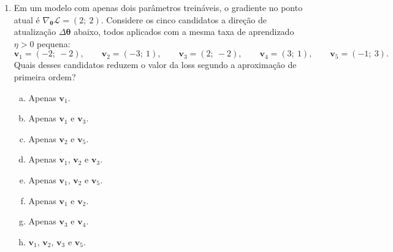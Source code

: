 \documentclass{dlproblemset}
\begin{document}
\begin{enumerate}[1)]
    \begin{enumerate}[(a)]
        \item Prevista $-3{,}20$ e real $-2{,}72$.
        \item Prevista $-2{,}72$ e real $-3{,}20$.
        \item Prevista $-3{,}20$ e real $-3{,}20$.
        \item Prevista $-0{,}32$ e real $-2{,}72$.
        \item Prevista $-3{,}20$ e real $-3{,}08$.
        \item Prevista $-2{,}00$ e real $-2{,}16$.
        \item Prevista $-3{,}20$ e real $-3{,}68$.
        \item Prevista $-6{,}40$ e real $-2{,}72$.
    \end{enumerate}

    \item Em um modelo com apenas dois parâmetros treináveis, o gradiente no ponto atual é $\nabla_{\boldsymbol{\theta}}\mathcal{L} = (2;\ 2)$. Considere os cinco candidatos a direção de atualização $\Delta\boldsymbol{\theta}$ abaixo, todos aplicados com a mesma taxa de aprendizado $\eta > 0$ pequena:
    \[
    \mathbf{v}_1 = (-2;\ -2), \qquad
    \mathbf{v}_2 = (-3;\ 1), \qquad
    \mathbf{v}_3 = (2;\ -2), \qquad
    \mathbf{v}_4 = (3;\ 1), \qquad
    \mathbf{v}_5 = (-1;\ 3).
    \]
    Quais desses candidatos reduzem o valor da loss segundo a aproximação de primeira ordem?

    \begin{enumerate}[(a)]
        \item Apenas $\mathbf{v}_1$.
        \item Apenas $\mathbf{v}_1$ e $\mathbf{v}_3$.
        \item Apenas $\mathbf{v}_2$ e $\mathbf{v}_5$.
        \item Apenas $\mathbf{v}_1$, $\mathbf{v}_2$ e $\mathbf{v}_3$.
        \item Apenas $\mathbf{v}_1$, $\mathbf{v}_2$ e $\mathbf{v}_5$.
        \item Apenas $\mathbf{v}_1$ e $\mathbf{v}_2$.
        \item Apenas $\mathbf{v}_3$ e $\mathbf{v}_4$.
        \item $\mathbf{v}_1$, $\mathbf{v}_2$, $\mathbf{v}_3$ e $\mathbf{v}_5$.
    \end{enumerate}


\end{enumerate}
\end{document}
